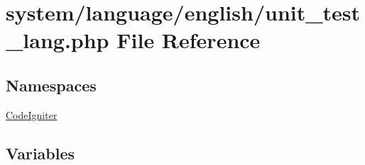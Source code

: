 \hypertarget{unit__test__lang_8php}{}\section{system/language/english/unit\+\_\+test\+\_\+lang.php File Reference}
\label{unit__test__lang_8php}
\subsection*{Namespaces}
\begin{DoxyCompactItemize}
\item 
 \mbox{\hyperlink{namespace_code_igniter}{Code\+Igniter}}
\end{DoxyCompactItemize}
\subsection*{Variables}

